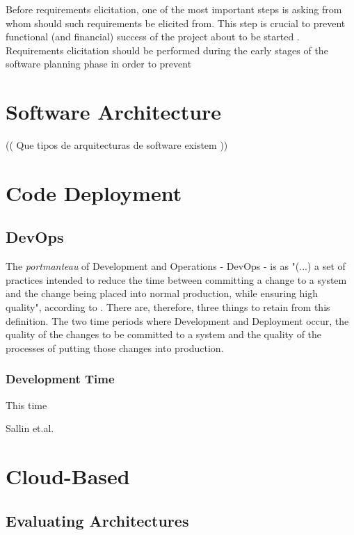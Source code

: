 Before requirements elicitation, one of the most important steps is asking from whom should such requirements be elicited from. This step is crucial to prevent functional (and financial) success of the project about to be started \parencite{lewellen_2020}. Requirements elicitation should be performed during the early stages of the software planning phase in order to prevent



\section{Software Architecture}\label{state-of-the-art:s:software-architecture}

(( Que tipos de arquitecturas de software existem ))

\section{Code Deployment}\label{state-of-the-art:s:code-deployment}

\subsection{DevOps}\label{state-of-the-art:ss:devops}

The \textit{portmanteau} of Development and Operations - DevOps - is as "(...) a set of practices intended to reduce the time between committing a change to a system and the change being placed into normal production, while ensuring high quality", according to \parencite{bass_weber_zhu_2015}. There are, therefore, three things to retain from this definition. The two time periods where Development and Deployment occur, the quality of the changes to be committed to a system and the quality of the processes of putting those changes into production.

\subsubsection{Development Time}
This time






Sallin et.al. \parencite{sallin_kropp_anslow_quilty_meier_2021}

\section{Cloud-Based}\label{state-of-the-art:s:cloud-based}

\subsection{Evaluating Architectures}\label{state-of-the-art:ss:evaluating-architectures}


